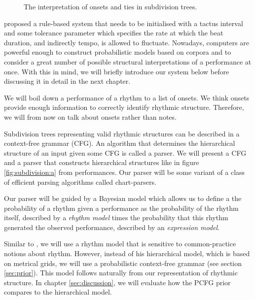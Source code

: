 \begin{figure}
\centering
{}

\caption{The interpretation of onsets and ties in subdivision trees.}
\label{fig:ties}
\end{figure}

\citet{longuet1976perception} proposed a rule-based system that needs to be initialised with a tactus interval and some tolerance parameter which specifies the rate at which the beat duration, and indirectly tempo, is allowed to fluctuate. Nowadays, computers are powerful enough to construct probabilistic models based on corpora and to consider a great number of possible structural interpretations of a performance at once. With this in mind, we will briefly introduce our system below before discussing it in detail in the next chapter.

We will boil down a performance of a rhythm to a list of onsets. We think onsets provide enough information to correctly identify rhythmic structure. Therefore, we will from now on talk about onsets rather than notes.

Subdivision trees representing valid rhythmic structures can be described in a context-free grammar (CFG). An algorithm that determines the hierarchical structure of an input given some CFG is called a parser. We will present a CFG and a parser that constructs hierarchical structures like in figure \ref{fig:subdivision:a} from performances. Our parser will be some variant of a class of efficient parsing algorithms called chart-parsers.

Our parser will be guided by a Bayesian model which allows us to define a the probability of a rhythm given a performance as the probability of the rhythm itself, described by a \textit{rhythm model} times the probability that this rhythm generated the observed performance, described by an \textit{expression model}.

Similar to \cite{temperley2009unified}, we will use a rhythm model that is sensitive to common-practice notions about rhythm. However, instead of his hierarchical model, which is based on metrical grids, we will use a probabilistic context-free grammar (see section \ref{sec:prior}). This model follows naturally from our representation of rhythmic structure. In chapter \ref{sec:discussion}, we will evaluate how the PCFG prior compares to the hierarchical model.

